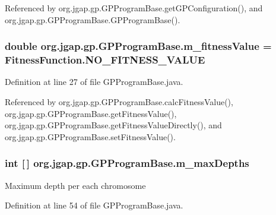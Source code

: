 Referenced by org.\-jgap.\-gp.\-G\-P\-Program\-Base.\-get\-G\-P\-Configuration(), and org.\-jgap.\-gp.\-G\-P\-Program\-Base.\-G\-P\-Program\-Base().

\hypertarget{classorg_1_1jgap_1_1gp_1_1_g_p_program_base_a036a159a751b60bee86a61a218d1508d}{
\subsubsection[{m\-\_\-fitness\-Value}]{\setlength{\rightskip}{0pt plus 5cm}double org.\-jgap.\-gp.\-G\-P\-Program\-Base.\-m\-\_\-fitness\-Value = {\bf Fitness\-Function.\-N\-O\-\_\-\-F\-I\-T\-N\-E\-S\-S\-\_\-\-V\-A\-L\-U\-E}\hspace{0.3cm}{\ttfamily [private]}}}\label{classorg_1_1jgap_1_1gp_1_1_g_p_program_base_a036a159a751b60bee86a61a218d1508d}


Definition at line 27 of file G\-P\-Program\-Base.\-java.



Referenced by org.\-jgap.\-gp.\-G\-P\-Program\-Base.\-calc\-Fitness\-Value(), org.\-jgap.\-gp.\-G\-P\-Program\-Base.\-get\-Fitness\-Value(), org.\-jgap.\-gp.\-G\-P\-Program\-Base.\-get\-Fitness\-Value\-Directly(), and org.\-jgap.\-gp.\-G\-P\-Program\-Base.\-set\-Fitness\-Value().

\hypertarget{classorg_1_1jgap_1_1gp_1_1_g_p_program_base_aec6460fd2ab63254e04f0729c7a60783}{
\subsubsection[{m\-\_\-max\-Depths}]{\setlength{\rightskip}{0pt plus 5cm}int \mbox{[}$\,$\mbox{]} org.\-jgap.\-gp.\-G\-P\-Program\-Base.\-m\-\_\-max\-Depths\hspace{0.3cm}{\ttfamily [private]}}}\label{classorg_1_1jgap_1_1gp_1_1_g_p_program_base_aec6460fd2ab63254e04f0729c7a60783}
Maximum depth per each chromosome 

Definition at line 54 of file G\-P\-Program\-Base.\-java.




